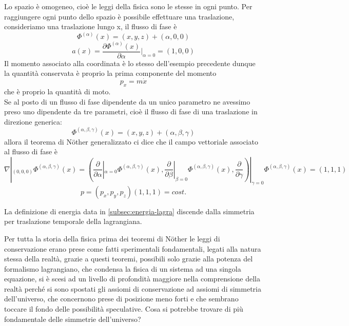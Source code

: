 \documentclass[
10pt, %
a4paper, %
oneside, %
headinclude,footinclude, %
BCOR5mm, %
]{scrartcl}
\begin{document}
\begin{esempio}
	Lo spazio è omogeneo, cioè le leggi della fisica sono le stesse in ogni punto. Per raggiungere ogni punto dello spazio è possibile effettuare una traslazione, consideriamo una traslazione lungo x, il flusso di fase è
	\[\Phi^{(\alpha)}(x) = (x, y, z)+(\alpha, 0, 0)\]
	\[a(x) = \frac{\partial \Phi^{(\alpha)}(x)}{\partial \alpha}|_{\alpha = 0} = (1, 0, 0)\]
	Il momento associato alla coordinata è lo stesso dell'esempio precedente dunque la quantità conservata è proprio la prima componente del momento
	\[p_x = m\dot{x}\]
	che è proprio la quantità di moto.\\
	Se al posto di un flusso di fase dipendente da un unico parametro ne avessimo preso uno dipendente da tre parametri, cioè il flusso di fase di una traslazione in direzione generica:
	\[\Phi^{(\alpha, \beta, \gamma)}(x) = (x, y, z)+(\alpha, \beta, \gamma)\]
	allora il teorema di N\"{o}ther generalizzato ci dice che il campo vettoriale associato al flusso di fase è
	\[\nabla|_{(0, 0, 0)}\Phi^{(\alpha, \beta, \gamma)}(x) =\left(\frac{\partial}{\partial\alpha}|_{\alpha=0} \Phi^{(\alpha, \beta, \gamma)}(x),
	\frac{\partial }{\partial\beta}|_{\beta = 0}\Phi^{(\alpha, \beta, \gamma)}(x),
	\frac{\partial }{\partial\gamma}\right)|_{\gamma = 0}\Phi^{(\alpha, \beta, \gamma)}(x)=(1, 1, 1) \]
	\[p = (p_x, p_y, p_z)(1, 1, 1) = cost.\]							
\end{esempio}
\begin{esempio}[Energia]
	La definizione di energia data in \ref{subsec:energia-lagra} discende dalla simmetria per traslazione temporale della lagrangiana.
\end{esempio}
\begin{osservazione}
	Per tutta la storia della fisica prima dei teoremi di N\"{o}ther le leggi di conservazione erano prese come fatti sperimentali fondamentali, legati alla natura stessa della realtà, grazie a questi teoremi, possibili solo grazie alla potenza del formalismo lagrangiano, che condensa la fisica di un sistema ad una singola equazione, si è scesi ad un livello di profondità maggiore nella comprensione della realtà perché si sono spostati gli assiomi di conservazione ad assiomi di simmetria dell'universo, che concernono prese di posizione meno forti e che sembrano toccare il fondo delle possibilità speculative. Cosa si potrebbe trovare di più fondamentale delle simmetrie dell'universo?  
\end{osservazione}
\end{document}
